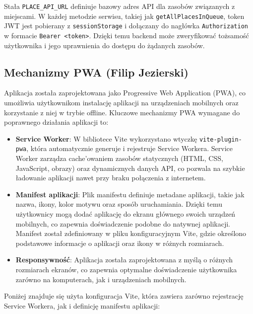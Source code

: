 Stała \texttt{PLACE\_API\_URL} definiuje bazowy adres API dla zasobów związanych z miejscami. W każdej metodzie serwisu, takiej jak \texttt{getAllPlacesInQueue}, token JWT jest pobierany z \texttt{sessionStorage} i dołączany do nagłówka \texttt{Authorization} w formacie \texttt{Bearer <token>}. Dzięki temu backend może zweryfikować tożsamość użytkownika i jego uprawnienia do dostępu do żądanych zasobów.

\subsection{Mechanizmy PWA (Filip Jezierski)}
Aplikacja została zaprojektowana jako Progressive Web Application (PWA), co umożliwia użytkownikom instalację aplikacji na urządzeniach mobilnych oraz korzystanie z niej w trybie offline. Kluczowe mechanizmy PWA wymagane do poprawnego działania aplikacji to:
\begin{itemize}
    \item \textbf{Service Worker}: W bibliotece Vite wykorzystano wtyczkę \texttt{vite-plugin-pwa}, która automatycznie generuje i rejestruje Service Workera. Service Worker zarządza cache'owaniem zasobów statycznych (HTML, CSS, JavaScript, obrazy) oraz dynamicznych danych API, co pozwala na szybkie ładowanie aplikacji nawet przy braku połączenia z internetem.
    \item \textbf{Manifest aplikacji}: Plik manifestu definiuje metadane aplikacji, takie jak nazwa, ikony, kolor motywu oraz sposób uruchamiania. Dzięki temu użytkownicy mogą dodać aplikację do ekranu głównego swoich urządzeń mobilnych, co zapewnia doświadczenie podobne do natywnej aplikacji. Manifest został zdefiniowany w pliku konfiguracyjnym Vite, gdzie określono podstawowe informacje o aplikacji oraz ikony w różnych rozmiarach.
    \item \textbf{Responsywność}: Aplikacja została zaprojektowana z myślą o różnych rozmiarach ekranów, co zapewnia optymalne doświadczenie użytkownika zarówno na komputerach, jak i urządzeniach mobilnych.
\end{itemize}

Poniżej znajduje się użyta konfiguracja Vite, która zawiera zarówno rejestrację Service Workera, jak i definicję manifestu aplikacji:

